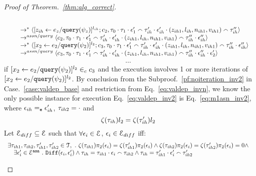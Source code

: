 \begin{proof}[Proof of Theorem.~\ref{thm:alg_correct}]
\begin{case}
\begin{subcase}
\[\begin{array}{l}
  \\ \qquad
  \rightarrow^{*} 
  \langle [\mathrel{ z_{ih} \leftarrow e_z / {\tt query}(\psi_z) }]^{l_{ih}};{c}_2, 
  \mathtt{\tau}_0 \cdot \mathtt{\tau}_1 \cdot \mathtt{\epsilon}_1' \smallfrown \mathtt{\tau}_{ih}' \cdot \mathtt{\epsilon}_{ih}' \cdot (z_{ih1}, l_{ih}, n_{ih1}, v_{ih1}) \smallfrown \mathtt{\tau}_{ih}'' \rangle 
  \\ \qquad
  \rightarrow^{assn/query} 
  \langle {c}_2,  \mathtt{\tau}_0 \cdot \mathtt{\tau}_1 \cdot \mathtt{\epsilon}_1'  \smallfrown \mathtt{\tau}_{ih}' \cdot \mathtt{\epsilon}_{ih}' \cdot (z_{ih1}, l_{ih}, n_{ih1}, v_{ih1}) \smallfrown \mathtt{\tau}_{ih}'' \cdot \mathtt{\epsilon}_{ih}'' \rangle  
  \\
  \qquad \rightarrow^{*} 
  \langle [\mathrel{ {x}_2 \leftarrow e_2 / {\tt query}(\psi_2) }]^{l_2};{c}_3, 
  \mathtt{\tau}_0 \cdot \mathtt{\tau}_1 \cdot \mathtt{\epsilon}_1'  \smallfrown \mathtt{\tau}_{ih}' \cdot \mathtt{\epsilon}_{ih}' \cdot (z_{ih1}, l_{ih}, n_{ih1}, v_{ih1}) \smallfrown \mathtt{\tau}_{ih}'' \cdot \mathtt{\epsilon}_{ih}'' \rangle 
  \\ \qquad
  \rightarrow^{assn/query} 
  \langle {c}_3,  \mathtt{\tau}_0 \cdot \mathtt{\tau}_1 \cdot \mathtt{\epsilon}_1' \smallfrown \mathtt{\tau}_{ih}' \cdot \mathtt{\epsilon}_{ih}' \cdot (z_{ih1}, l_{ih}, n_{ih1}, v_{ih1}) \smallfrown \mathtt{\tau}_{ih}'' \cdot \mathtt{\epsilon}_{ih}''\cdot \mathtt{\epsilon}_2' \rangle 
\end{array}
\]
%
 \[\cdots\]
 if $[\mathrel{ {x}_2 \leftarrow e_2 / {\tt query}(\psi_2) }]^{l_2} \in_c c_3$ and the execution involves 1 or more iterations of $[\mathrel{ {x}_2 \leftarrow e_2 / {\tt query}(\psi_2) }]^{l_2}$.
 By conclusion from the Subproof.~\ref{pf:noiteration_inv2} in Case.~\ref{case:valdep_base} and restriction from Eq.~\ref{eq:valdep_invn}, 
 we know the only possible instance for execution Eq.~\ref{eq:valdep_inv2} is Eq.~\ref{eq:m1asn_inv2},
 where $\mathtt{\epsilon}_{ih} =_{\mathtt{e}} \mathtt{\epsilon}_{ih}'$, $\mathtt{\tau}_{ih2} = \cdot$ and
 \[
 \mathtt{\zeta}(\mathtt{\tau}_{ih}) l_2 = \mathtt{\zeta}(\mathtt{\tau}_{ih}') l_2
 \]
%
%
Let $\mathcal{E}_{diff} \subseteq \mathcal{E} $ such that $\forall \mathtt{\epsilon}_i \in \mathcal{E}$, $\mathtt{\epsilon}_i \in \mathcal{E}_{diff}$ iff:
\begin{equation}
\label{eq:valdep_ihdiff}
  \begin{array}{l}
  \exists \mathtt{\tau}_{ih1}, \mathtt{\tau}_{ih2}, \mathtt{\tau}_{ih1}', \mathtt{\tau}_{ih2}' \in \mathcal{T},
  ~.~ 
  \mathtt{\zeta} (\mathtt{\tau}_{ih1} )\pi_2({\mathtt{\epsilon}_i}) = \mathtt{\zeta}(\mathtt{\tau}_{ih1}') \pi_2(\mathtt{\epsilon}_i) \land
  \mathtt{\zeta} (\mathtt{\tau}_{ih2} )\pi_2({\mathtt{\epsilon}_i}) = \mathtt{\zeta}(\mathtt{\tau}_{ih2}') \pi_2(\mathtt{\epsilon}_i) = 0
  \land
  \\ \quad \exists \mathtt{\epsilon}_i' \in \mathcal{E}^{\mathtt{{asn}}}  ~.~
  \mathtt{Diff}(\mathtt{\epsilon}_i, \mathtt{\epsilon}_i') \land 
  \mathtt{\tau}_{ih} = \mathtt{\tau}_{ih1} \cdot \mathtt{\epsilon}_i \smallfrown \mathtt{\tau}_{ih2} 
  \land 
  \mathtt{\tau}_{ih} = \mathtt{\tau}_{ih1}' \cdot \mathtt{\epsilon}_i' \smallfrown \mathtt{\tau}_{ih2}'

\end{array}
\end{equation}
\end{subcase}
\end{case}
\end{proof}
